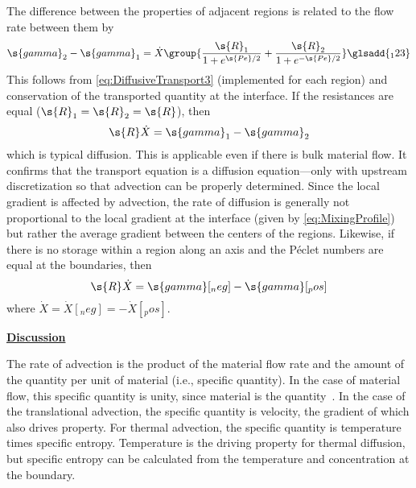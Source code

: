 The difference between the properties of adjacent regions is related to the flow rate between them by
\begin{equation}
  \s{gamma}_2 - \s{gamma}_1 = \dot{X}\group{\frac{\s{R}_1}{1 + e^{\s{Pe}/2}} + \frac{\s{R}_2}{1 + e^{-\s{Pe}/2}}}%
  \glsadd{_123}
\end{equation}
This follows from \autoref{eq:DiffusiveTransport3} (implemented for each region) and conservation of the transported quantity at the interface.  If the resistances are equal ($\s{R}_1 = \s{R}_2 = \s{R}$), then
\begin{equation}
  \label{eq:DiffusiveTransportTwoRegion}
  \s{R}\dot{X} = \s{gamma}_1 - \s{gamma}_2%
\end{equation}
which is typical diffusion.  This is applicable even if there is bulk material flow.  It confirms that the transport equation is a diffusion equation---only with upstream discretization so that advection can be properly determined.  Since the local gradient is affected by advection, the rate of diffusion is generally not proportional to the local gradient at the interface (given by \autoref{eq:MixingProfile}) but rather the average gradient between the centers of the regions.  Likewise, if there is no storage within a region along an axis and the P\'eclet numbers are equal at the boundaries, then
\begin{equation}
  \label{eq:DiffusiveTransportRegion}
  \s{R}\dot{X} = \s{gamma}[_neg] - \s{gamma}[_pos]
\end{equation}
where $\dot{X} = \dot{X}[_neg] = -\dot{X}[_pos]$.


\noindent\underline{\textbf{Discussion}}

The rate of advection is the product of the material flow rate and the amount of the quantity per unit of material (i.e., specific quantity).  In the case of material flow, this specific quantity is unity, since material is the quantity~\cite{Present1958}.  In the case of the translational advection, the specific quantity is velocity, the gradient of which also drives property.  For thermal advection, the specific quantity is temperature times specific entropy.  Temperature is the driving property for thermal diffusion, but specific entropy can be calculated from the temperature and concentration at the boundary.

